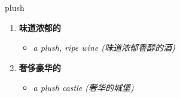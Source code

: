 
\begin{frame}
{\huge plush}
\begin{center}
\begin{enumerate}\Large
  \item \textbf{味道浓郁的}
  \begin{itemize}
    \item \em{\Large{a plush, ripe wine (味道浓郁香醇的酒)}}
  \end{itemize}
  \item \textbf{奢侈豪华的}
  \begin{itemize}
    \item \em{\Large{a plush castle (奢华的城堡)}}
  \end{itemize}
\end{enumerate}
\end{center}
\end{frame}
